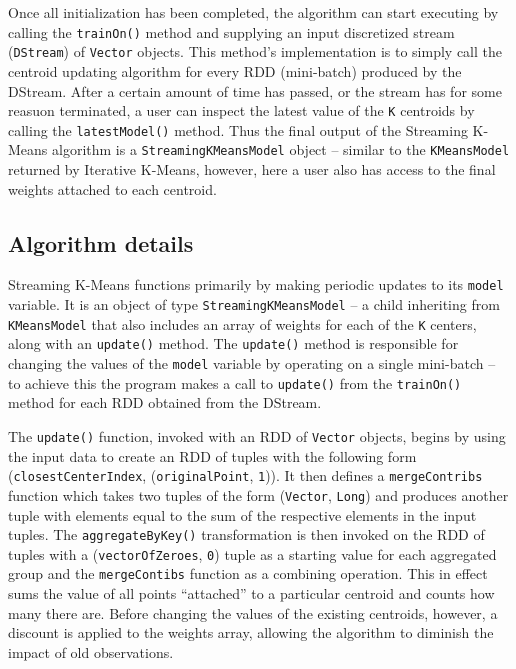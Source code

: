 \documentclass{l4proj}
\begin{document}
Once all initialization has been completed, the algorithm can start executing by calling the \texttt{trainOn()} method and supplying an input discretized stream (\texttt{DStream}) of \texttt{Vector} objects. This method's implementation is to simply call the centroid updating algorithm for every RDD (mini-batch) produced by the DStream. After a certain amount of time has passed, or the stream has for some reasuon terminated, a user can inspect the latest value of the \texttt{K} centroids by calling the \texttt{latestModel()} method. Thus the final output of the Streaming K-Means algorithm is a \texttt{StreamingKMeansModel} object -- similar to the \texttt{KMeansModel} returned by Iterative K-Means, however, here a user also has access to the final weights attached to each centroid.

\subsection{Algorithm details}

Streaming K-Means functions primarily by making periodic updates to its \texttt{model} variable. It is an object of type \texttt{StreamingKMeansModel} -- a child inheriting from \texttt{KMeansModel} that also includes an array of weights for each of the \texttt{K} centers, along with an \texttt{update()} method. The \texttt{update()} method is responsible for changing the values of the \texttt{model} variable by operating on a single mini-batch -- to achieve this the program makes a call to \texttt{update()} from the \texttt{trainOn()} method for each RDD obtained from the DStream.

The \texttt{update()} function, invoked with an RDD of \texttt{Vector} objects, begins by using the input data to create an RDD of tuples with the following form (\texttt{closestCenterIndex}, (\texttt{originalPoint}, \texttt{1})). It then defines a \texttt{mergeContribs} function which takes two tuples of the form (\texttt{Vector}, \texttt{Long}) and produces another tuple with elements equal to the sum of the respective elements in the input tuples. The \texttt{aggregateByKey()} transformation is then invoked on the RDD of tuples with a (\texttt{vectorOfZeroes}, \texttt{0}) tuple as a starting value for each aggregated group and the \texttt{mergeContibs} function as a combining operation. This in effect sums the value of all points ``attached'' to a particular centroid and counts how many there are. Before changing the values of the existing centroids, however, a discount is applied to the weights array, allowing the algorithm to diminish the impact of old observations.
\end{document}
